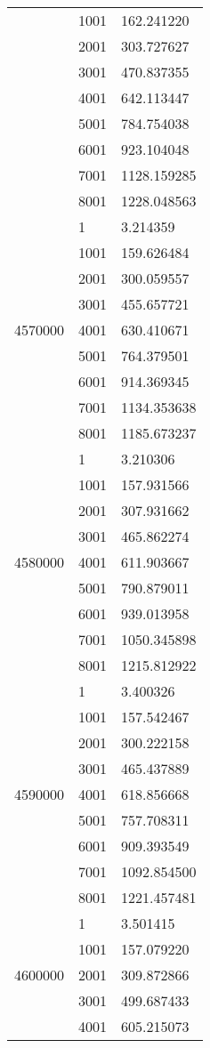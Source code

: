 \begin{table}[htb!]
\begin{tabular}{lll}
 & 1001 & 162.241220 \\
 & 2001 & 303.727627 \\
 & 3001 & 470.837355 \\
 & 4001 & 642.113447 \\
 & 5001 & 784.754038 \\
 & 6001 & 923.104048 \\
 & 7001 & 1128.159285 \\
 & 8001 & 1228.048563 \\
\multirow[c]{9}{*}{4570000} & 1 & 3.214359 \\
 & 1001 & 159.626484 \\
 & 2001 & 300.059557 \\
 & 3001 & 455.657721 \\
 & 4001 & 630.410671 \\
 & 5001 & 764.379501 \\
 & 6001 & 914.369345 \\
 & 7001 & 1134.353638 \\
 & 8001 & 1185.673237 \\
\multirow[c]{9}{*}{4580000} & 1 & 3.210306 \\
 & 1001 & 157.931566 \\
 & 2001 & 307.931662 \\
 & 3001 & 465.862274 \\
 & 4001 & 611.903667 \\
 & 5001 & 790.879011 \\
 & 6001 & 939.013958 \\
 & 7001 & 1050.345898 \\
 & 8001 & 1215.812922 \\
\multirow[c]{9}{*}{4590000} & 1 & 3.400326 \\
 & 1001 & 157.542467 \\
 & 2001 & 300.222158 \\
 & 3001 & 465.437889 \\
 & 4001 & 618.856668 \\
 & 5001 & 757.708311 \\
 & 6001 & 909.393549 \\
 & 7001 & 1092.854500 \\
 & 8001 & 1221.457481 \\
\multirow[c]{9}{*}{4600000} & 1 & 3.501415 \\
 & 1001 & 157.079220 \\
 & 2001 & 309.872866 \\
 & 3001 & 499.687433 \\
 & 4001 & 605.215073 \\

\end{tabular}
\end{table}
